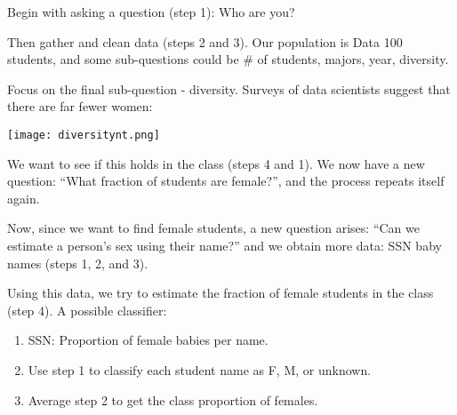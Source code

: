 \begin{example}{Begin with asking a question (step 1): Who are you?

Then gather and clean data (steps 2 and 3). Our population is Data 100 students, and some sub-questions could be \# of students, majors, year, diversity.

Focus on the final sub-question - diversity. Surveys of data scientists suggest that there are far fewer women:
\begin{center}
\texttt{[image: diversitynt.png]}
\end{center}

We want to see if this holds in the class (steps 4 and 1). We now have a new question: ``What fraction of students are female?'', and the process repeats itself again.

\tcbline

Now, since we want to find female students, a new question arises: ``Can we estimate a person's sex using their name?'' and we obtain more data: SSN baby names (steps 1, 2, and 3).

Using this data, we try to estimate the fraction of female students in the class (step 4). A possible classifier:
\begin{enumerate}
\item SSN: Proportion of female babies per name.
\item Use step 1 to classify each student name as F, M, or unknown.
\item Average step 2 to get the class proportion of females.
\end{enumerate}

}
\end{example}
